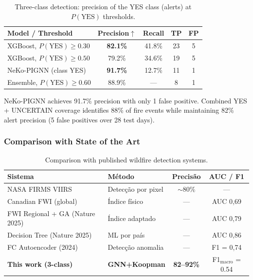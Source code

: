 \documentclass[preprint,times,numbers]{elsarticle}
\begin{document}
\begin{table}[htbp]
\centering
\caption{Three-class detection: precision of the YES class (alerts) at $P(\text{YES})$ thresholds.}
\label{tab:three_class}
\small
\begin{tabular}{@{}lcccc@{}}
\toprule
\textbf{Model / Threshold} & \textbf{Precision}$\uparrow$ & \textbf{Recall} & \textbf{TP} & \textbf{FP} \\
\midrule
XGBoost, $P(\text{YES}) \geq 0.30$ & \textbf{82.1\%} & 41.8\% & 23 & 5 \\
XGBoost, $P(\text{YES}) \geq 0.50$ & 79.2\% & 34.6\% & 19 & 5 \\
NeKo-PIGNN (class YES) & \textbf{91.7\%} & 12.7\% & 11 & 1 \\
Ensemble, $P(\text{YES}) \geq 0.60$ & 88.9\% & --- & 8 & 1 \\
\bottomrule
\end{tabular}
\end{table}

NeKo-PIGNN achieves 91.7\% precision with only 1 false positive. Combined YES + UNCERTAIN coverage identifies 88\% of fire events while maintaining 82\% alert precision (5 false positives over 28 test days).

\subsubsection{Comparison with State of the Art}

\begin{table}[htbp]
\centering
\caption{Comparison with published wildfire detection systems.}
\label{tab:sota}
\small
\begin{tabular}{@{}llcc@{}}
\toprule
\textbf{Sistema} & \textbf{Método} & \textbf{Precisão} & \textbf{AUC / F1} \\
\midrule
NASA FIRMS VIIRS & Detecção por pixel & $\sim$80\% & --- \\
Canadian FWI (global) & Índice físico & --- & AUC 0,69 \\
FWI Regional + GA (Nature 2025) & Índice adaptado & --- & AUC 0,79 \\
Decision Tree (Nature 2025) & ML por país & --- & AUC 0,86 \\
FC Autoencoder (2024) & Detecção anomalia & --- & F1 = 0,74 \\
\textbf{This work (3-class)} & \textbf{GNN+Koopman} & \textbf{82--92\%} & F1$_\text{macro}$ = 0.54 \\
\bottomrule
\end{tabular}
\end{table}
\end{document}
